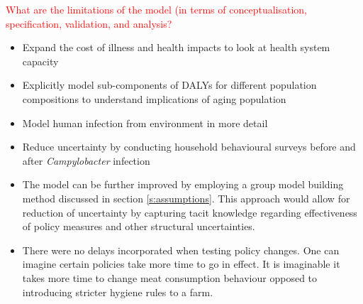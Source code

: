 \textcolor{red}{What are the limitations of the model (in terms of conceptualisation, specification, validation, and analysis?}
\begin{itemize}
    \item Expand the cost of illness and health impacts to look at health system capacity
    \item Explicitly model sub-components of DALYs for different population compositions to understand implications of aging population
    \item Model human infection from environment in more detail
    \item Reduce uncertainty by conducting household behavioural surveys before and after \textit{Campylobacter} infection
    \item The model can be further improved by employing a group model building method discussed in section \ref{s:assumptions}. This approach would allow for reduction of uncertainty by capturing tacit knowledge regarding effectiveness of policy measures and other structural uncertainties.
    \item There were no delays incorporated when testing policy changes. One can imagine certain policies take more time to go in effect. It is imaginable it takes more time to change meat consumption behaviour opposed to introducing stricter hygiene rules to a farm.
\end{itemize}